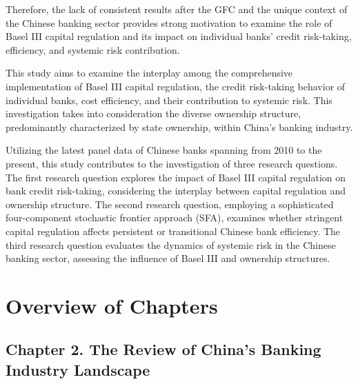 \documentclass[
  12pt,
  a4paper,
]{scrreprt}
\begin{document}
Therefore, the lack of consistent results after the GFC and the unique
context of the Chinese banking sector provides strong motivation to
examine the role of Basel III capital regulation and its impact on
individual banks' credit risk-taking, efficiency, and systemic risk
contribution.

This study aims to examine the interplay among the comprehensive
implementation of Basel III capital regulation, the credit risk-taking
behavior of individual banks, cost efficiency, and their contribution to
systemic risk. This investigation takes into consideration the diverse
ownership structure, predominantly characterized by state ownership,
within China's banking industry.

Utilizing the latest panel data of Chinese banks spanning from 2010 to
the present, this study contributes to the investigation of three
research questions. The first research question explores the impact of
Basel III capital regulation on bank credit risk-taking, considering the
interplay between capital regulation and ownership structure. The second
research question, employing a sophisticated four-component stochastic
frontier approach (SFA), examines whether stringent capital regulation
affects persistent or transitional Chinese bank efficiency. The third
research question evaluates the dynamics of systemic risk in the Chinese
banking sector, assessing the influence of Basel III and ownership
structures.

\section{Overview of Chapters}\label{overview-of-chapters}

\subsection{Chapter 2. The Review of China's Banking Industry
Landscape}\label{chapter-2.-the-review-of-chinas-banking-industry-landscape}
\end{document}
